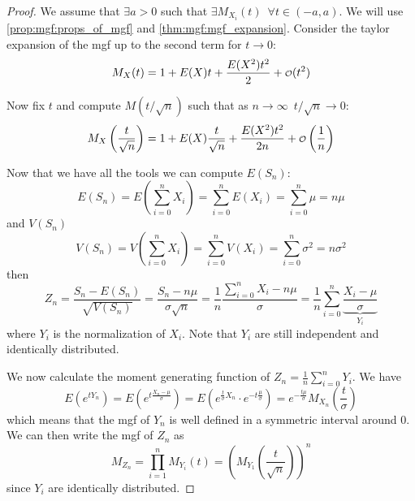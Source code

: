 \documentclass[12pt]{extarticle}
\begin{document}
\begin{proof}
    We assume that $\exists a > 0$ such that $\exists M_{X_i}(t) \enspace \forall t \in (-a, a)$.
    We will use \autoref{prop:mgf:props_of_mgf} and \autoref{thm:mgf:mgf_expansion}.
    Consider the taylor expansion of the mgf up to the second term for $t \to 0$:
    \begin{equation}
        M_X(t) = 1+E(X) t + \frac{E(X^2) t^2}{2} + \o(t^2)
    \end{equation}

    Now fix $t$ and compute $M(t/ \sqrt{n})$ such that as $n \to \infty \enspace t/ \sqrt{n} \to 0$:
    \begin{equation}
        M_X\left(\frac{t}{\sqrt{n}}\right) = 1+E(X) \frac{t}{\sqrt{n}} + \frac{E(X^2) t^2}{2n} + \o\left(\frac{1}{n}\right)
    \end{equation}

    Now that we have all the tools we can compute $E(S_n)$:
    \begin{equation}
        E(S_n) = E\left(\sum_{i = 0}^n X_i\right) = \sum_{i = 0}^n E(X_i) = \sum_{i = 0}^n \mu = n \mu
    \end{equation}
    and $V(S_n)$
    \begin{equation}
        V(S_n) = V\left(\sum_{i = 0}^n X_i\right) = \sum_{i = 0}^n V(X_i) = \sum_{i = 0}^n \sigma^2 = n \sigma^2
    \end{equation}
    then
    \begin{equation}
        Z_n = \frac{S_n - E(S_n)}{\sqrt{V(S_n)}}= \frac{S_n - n \mu}{\sigma \sqrt{n}} = \frac{1}{n} \frac{\sum_{i = 0}^n X_i - n \mu}{\sigma} = \frac{1}{n} \sum_{i = 0}^n \underbrace{\frac{X_i - \mu}{\sigma}}_{Y_i}
    \end{equation}
    where $Y_i$ is the normalization of $X_i$.
    Note that $Y_i$ are still independent and identically distributed.

    We now calculate the moment generating function of $Z_n = \frac{1}{n} \sum_{i = 0}^n Y_i$.
    We have
    \begin{equation}
        E\left(e^{t Y_n}\right) = E\left(e^{t \frac{X_n - \mu}{\sigma}}\right) = E\left(e^{\frac{t}{\sigma}X_n} \cdot e^{-t \frac{\mu}{\sigma}}\right) = e^{-\frac{t \mu}{\sigma}} M_{X_n}\left(\frac{t}{\sigma}\right)
    \end{equation}
    which means that the mgf of $Y_n$ is well defined in a symmetric interval around 0. We can then write the mgf of $Z_n$ as
    \begin{equation}
        M_{Z_n} = \prod_{i = 1}^n M_{Y_i}(t) = \left(M_{Y_1}\left(\frac{t}{\sqrt{n}}\right)\right)^n
    \end{equation}
    since $Y_i$ are identically distributed.


\end{proof}
\end{document}
